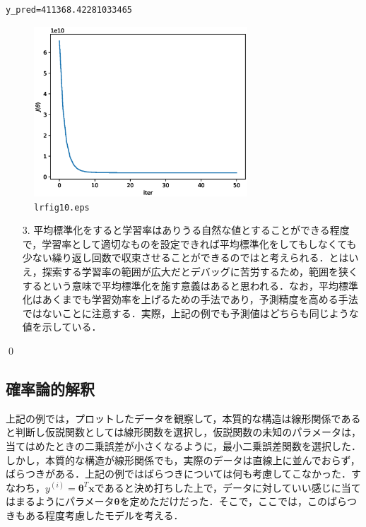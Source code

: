 \begin{ans}
\begin{cod}[\texttt{lr13.py}]
\begin{lstlisting}
y_pred=411368.42281033465
\end{lstlisting}
\begin{figure}[H]
\begin{center}
\framed
\includegraphics[width=8cm]{code/lrfig10.eps}
\vspace{-10pt}
\caption{\texttt{lrfig10.eps}}
\endframed
\end{center}
\end{figure}
\end{cod}
\begin{enumerate}
\item[3.] 平均標準化をすると学習率はありうる自然な値とすることができる程度で，学習率として適切なものを設定できれば平均標準化をしてもしなくても少ない繰り返し回数で収束させることができるのではと考えられる．とはいえ，探索する学習率の範囲が広大だとデバッグに苦労するため，範囲を狭くするという意味で平均標準化を施す意義はあると思われる．なお，平均標準化はあくまでも学習効率を上げるための手法であり，予測精度を高める手法ではないことに注意する．実際，上記の例でも予測値はどちらも同じような値を示している．
\end{enumerate}
\qed
\end{ans}

\subsection{確率論的解釈}

上記の例では，プロットしたデータを観察して，本質的な構造は線形関係であると判断し仮説関数としては線形関数を選択し，仮説関数の未知のパラメータは，当てはめたときの二乗誤差が小さくなるように，最小二乗誤差関数を選択した．しかし，本質的な構造が線形関係でも，実際のデータは直線上に並んでおらず，ばらつきがある．上記の例ではばらつきについては何も考慮してこなかった．すなわち，$y^{(i)}={\bm \theta}^T{\bm x}$であると決め打ちした上で，データに対していい感じに当てはまるようにパラメータ${\bm \theta}$を定めただけだった．そこで，ここでは，このばらつきもある程度考慮したモデルを考える．

